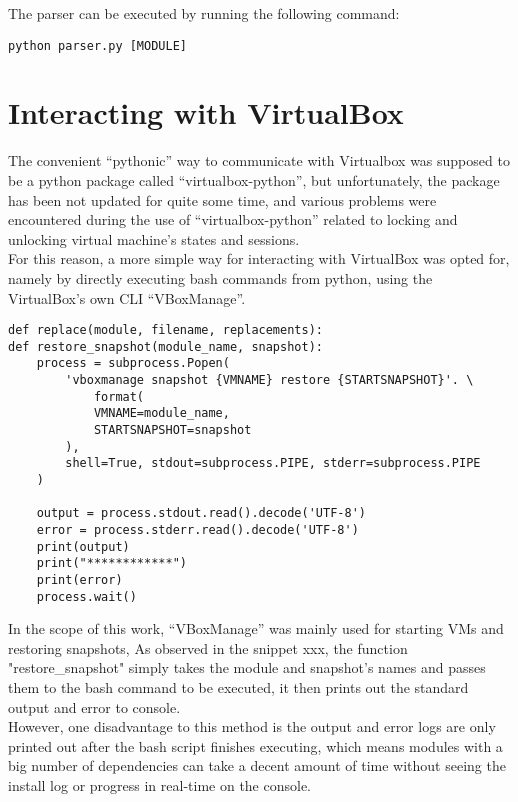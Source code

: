 The parser can be executed by running the following command:\\
\begin{lstlisting}[caption=Parser command, style=pythonstyle]
python parser.py [MODULE]
\end{lstlisting}
\clearpage

\section{Interacting with VirtualBox}
The convenient “pythonic” way to communicate with Virtualbox was supposed to be a python package called “virtualbox-python”\cite{sethmlarson}, but unfortunately, the package has been not updated for quite some time, and various problems were encountered during the use of  “virtualbox-python” related to locking and unlocking virtual machine’s states and sessions.\\
For this reason, a more simple way for interacting with VirtualBox was opted for, namely by directly executing bash commands from python, using the VirtualBox’s own CLI “VBoxManage”\cite{vboxmanage}.\\

\begin{lstlisting}[caption=Restore snapshot, style=pythonstyle]
def replace(module, filename, replacements):
def restore_snapshot(module_name, snapshot):
    process = subprocess.Popen(
        'vboxmanage snapshot {VMNAME} restore {STARTSNAPSHOT}'. \
            format(
            VMNAME=module_name,
            STARTSNAPSHOT=snapshot
        ),
        shell=True, stdout=subprocess.PIPE, stderr=subprocess.PIPE
    )

    output = process.stdout.read().decode('UTF-8')
    error = process.stderr.read().decode('UTF-8')
    print(output)
    print("************")
    print(error)
    process.wait()
\end{lstlisting}
In the scope of this work, “VBoxManage” was mainly used for starting VMs and restoring snapshots, As observed in the snippet xxx, the function "restore\_snapshot" simply takes the module and snapshot’s names and passes them to the bash command to be executed, it then prints out the standard output and error to console.\\

However, one disadvantage to this method is the output and error logs are only printed out after the bash script finishes executing, which means modules with a big number of dependencies can take a decent amount of time without seeing the install log or progress in real-time on the console.\\
\clearpage

